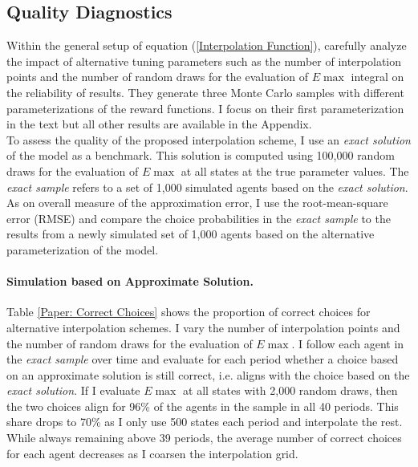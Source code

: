 \subsection{Quality Diagnostics}
Within the general setup of equation (\ref{Interpolation Function}), \citet{Keane.1994} carefully analyze the impact of alternative tuning parameters such as the number of interpolation points and the number of random draws for the evaluation of $E\max$ integral on the reliability of results. They generate three Monte Carlo samples with different parameterizations of the reward functions. I focus on their first parameterization in the text but all other results are available in the Appendix.\\\newline
%
To assess the quality of the proposed interpolation scheme, I use an \textit{exact solution} of the model as a benchmark. This solution is computed using 100,000 random draws for the evaluation of $E\max$ at all states at the true parameter values. The \textit{exact sample} refers to a set of 1,000 simulated agents based on the \textit{exact solution}. As on overall measure of the approximation error, I use the root-mean-square error (RMSE) and compare the choice probabilities in the \textit{exact sample} to the results from a newly simulated set of 1,000 agents based on the alternative parameterization of the model.
\paragraph{Simulation based on Approximate Solution.}
Table \ref{Paper: Correct Choices} shows the proportion of correct choices for alternative interpolation schemes. I vary the number of interpolation points and the number of random draws for the evaluation of $E\max$. I follow each agent in the \textit{exact sample} over time and evaluate for each period whether a choice based on an approximate solution is still correct, i.e. aligns with the choice based on the \textit{exact solution}. If I evaluate $E\max$ at all states with 2,000 random draws, then the two choices align for 96\% of the agents in the sample in all 40 periods. This share drops to 70\% as I only use 500 states each period and interpolate the rest. While always remaining above 39 periods, the average number of correct choices for each agent decreases as I coarsen the interpolation grid.

